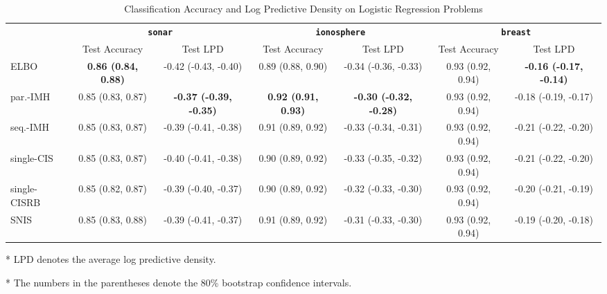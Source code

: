 
\begin{table*}
  \centering
  \caption{Classification Accuracy and Log Predictive Density on Logistic Regression Problems}\label{table:logistic}
  \setlength{\tabcolsep}{3pt}
  \begin{threeparttable}
  \begin{tabular}{lcccccc}
    \toprule
     & \multicolumn{2}{c}{\textbf{\texttt{sonar}}} & \multicolumn{2}{c}{\textbf{\texttt{ionosphere}}} & \multicolumn{2}{c}{\textbf{\texttt{breast}}} \\
    \cmidrule(lr){2-3}\cmidrule(lr){4-5}\cmidrule(lr){6-7}
    & Test Accuracy & Test LPD
    & Test Accuracy & Test LPD
    & Test Accuracy & Test LPD \\\midrule
    ELBO & \textbf{0.86 {\scriptsize(0.84, 0.88)}} & -0.42 {\scriptsize(-0.43, -0.40)} & 0.89 {\scriptsize(0.88, 0.90)} & -0.34 {\scriptsize(-0.36, -0.33)} & 0.93 {\scriptsize(0.92, 0.94)} & \textbf{-0.16 {\scriptsize(-0.17, -0.14)}}  \\\arrayrulecolor{black!30}\midrule
    par.-IMH & 0.85 {\scriptsize(0.83, 0.87)} & \textbf{-0.37 {\scriptsize(-0.39, -0.35)}} & \textbf{0.92 {\scriptsize(0.91, 0.93)}} & \textbf{-0.30 {\scriptsize(-0.32, -0.28)}} & 0.93 {\scriptsize(0.92, 0.94)} & -0.18 {\scriptsize(-0.19, -0.17)} \\
    seq.-IMH & 0.85 {\scriptsize(0.83, 0.87)} & -0.39 {\scriptsize(-0.41, -0.38)} & 0.91 {\scriptsize(0.89, 0.92)} & -0.33 {\scriptsize(-0.34, -0.31)} & 0.93 {\scriptsize(0.92, 0.94)} & -0.21 {\scriptsize(-0.22, -0.20)} \\
    single-CIS & 0.85 {\scriptsize(0.83, 0.87)} & -0.40 {\scriptsize(-0.41, -0.38)} & 0.90 {\scriptsize(0.89, 0.92)} & -0.33 {\scriptsize(-0.35, -0.32)} & 0.93 {\scriptsize(0.92, 0.94)} & -0.21 {\scriptsize(-0.22, -0.20)} \\
    single-CISRB & 0.85 {\scriptsize(0.82, 0.87)} & -0.39 {\scriptsize(-0.40, -0.37)} & 0.90 {\scriptsize(0.89, 0.92)} & -0.32 {\scriptsize(-0.33, -0.30)} & 0.93 {\scriptsize(0.92, 0.94)} & -0.20 {\scriptsize(-0.21, -0.19)} \\
    SNIS & 0.85 {\scriptsize(0.83, 0.88)} & -0.39 {\scriptsize(-0.41, -0.37)} & 0.91 {\scriptsize(0.89, 0.92)} & -0.31 {\scriptsize(-0.33, -0.30)} & 0.93 {\scriptsize(0.92, 0.94)} & -0.19 {\scriptsize(-0.20, -0.18)} \\\bottomrule
  \end{tabular}
  \begin{tablenotes}
    \item[*]{\footnotesize LPD denotes the average log predictive density.}
    \item[*]{\footnotesize The numbers in the parentheses denote the 80\% bootstrap confidence intervals.}
  \end{tablenotes}
  \end{threeparttable}
\end{table*}

